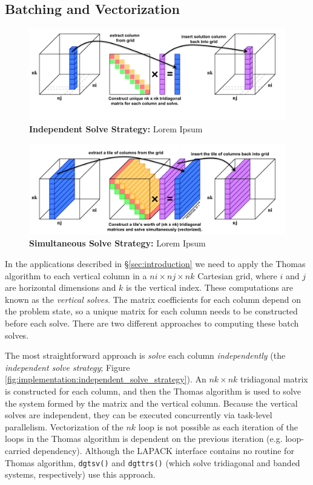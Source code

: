 \documentclass{sig-alternate-05-2015}
\begin{document}
\subsection{Batching and Vectorization}
\label{sec:implementation:batching_and_parallelism}

\begin{figure}[!bt]
    \centering
    \label{fig:independent_solve_strategy}
    \caption{\textbf{Independent Solve Strategy:} Lorem Ipsum}
    \includegraphics[width=0.95\columnwidth]{figures/tds_scalar.pdf}
\end{figure}

\begin{figure}[!bt]
    \centering
    \label{fig:simultaneous_solve_strategy}
    \caption{\textbf{Simultaneous Solve Strategy:} Lorem Ipsum}
    \includegraphics[width=0.95\columnwidth]{figures/tds_vector.pdf}
\end{figure}

In the applications described in \S\ref{sec:introduction} we need to apply the
  Thomas algorithm to each vertical column in a \(ni \times nj \times nk\)
  Cartesian grid, where \(i\) and \(j\) are horizontal dimensions and \(k\) is
  the vertical index.
These computations are known as the \emph{vertical solves}.
The matrix coefficients for each column depend on the problem state, so a
  unique matrix for each column needs to be constructed before each solve.
There are two different approaches to computing these batch solves.

The most straightforward approach is \emph{solve} each column
  \emph{independently} (the \emph{independent solve strategy}; Figure
  \ref{fig:implementation:independent_solve_strategy}).
An \(nk \times nk\) tridiagonal matrix is constructed for each column, and then
  the Thomas algorithm is used to solve the system formed by the matrix and the
  vertical column.
Because the vertical solves are independent, they can be executed concurrently
  via task-level parallelism.
Vectorization of the \(nk\) loop is not possible as each iteration of the loops
  in the Thomas algorithm is dependent on the previous iteration (e.g.
  loop-carried dependency).
Although the LAPACK interface contains no routine for Thomas algorithm,
  \lstinline{dgtsv()} and \lstinline{dgttrs()} (which solve tridiagonal and
  banded systems, respectively) use this approach.
\end{document}
